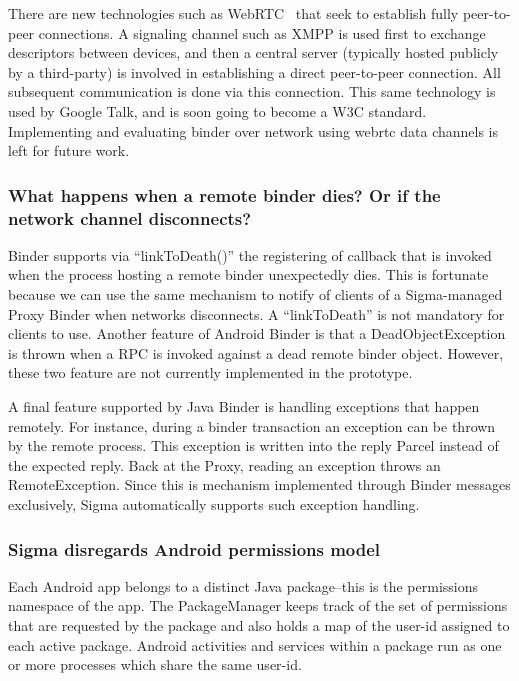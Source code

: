\documentclass[prodmode]{acmlarge}
\begin{document}
There are new technologies such as WebRTC~\cite{GoogleTalkLibrary} that seek to establish fully peer-to-peer connections. A signaling channel such as XMPP is used first to exchange descriptors between devices, and then a central server (typically hosted publicly by a third-party) is involved in establishing a direct peer-to-peer connection. All subsequent communication is done via this connection. This same technology is used by Google Talk, and is soon going to become a W3C standard. Implementing and evaluating binder over network using webrtc data channels is left for future work.

\subsubsection{What happens when a remote binder dies? Or if the network channel disconnects?}
Binder supports via ``linkToDeath()'' the registering of callback that is invoked when the process hosting a remote binder unexpectedly dies. This is fortunate because we can use the same mechanism to notify of clients of a Sigma-managed Proxy Binder when networks disconnects. A ``linkToDeath'' is not mandatory for clients to use. Another feature of Android Binder is that a DeadObjectException is thrown when a RPC is invoked against a dead remote binder object. However, these two feature are not currently implemented in the prototype.

A final feature supported by Java Binder is handling exceptions that happen remotely. For instance, during a binder transaction an exception can be thrown by the remote process. This exception is written into the reply Parcel instead of the expected reply. Back at the Proxy, reading an exception throws an RemoteException. Since this is mechanism implemented through Binder messages exclusively, Sigma automatically supports such exception handling.

\subsubsection{Sigma disregards Android permissions model}
\label{sec:DealingWithAndroidPermissions}
Each Android app belongs to a distinct Java package--this is the permissions namespace of the app. The PackageManager keeps track of the set of permissions that are requested by the package and also holds a map of the user-id assigned to each active package. Android activities and services within a package run as one or more processes which share the same user-id.
\end{document}
